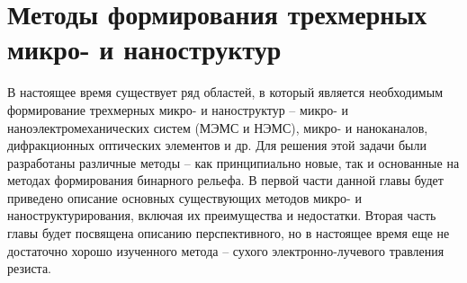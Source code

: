 \chapter{Методы формирования трехмерных микро- и наноструктур}

В настоящее время существует ряд областей, в который является необходимым формирование трехмерных микро- и наноструктур -- микро- и наноэлектромеханических систем (МЭМС и НЭМС), микро- и наноканалов, дифракционных оптических элементов и др. Для решения этой задачи были разработаны различные методы -- как принципиально новые, так и основанные на методах формирования бинарного рельефа. В первой части данной главы будет приведено описание основных существующих методов микро- и наноструктурирования, включая их преимущества и недостатки. Вторая часть главы будет посвящена описанию перспективного, но в настоящее время еще не достаточно хорошо изученного метода -- сухого электронно-лучевого травления резиста.



